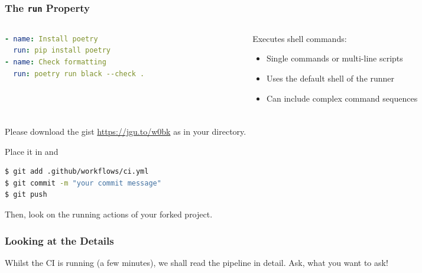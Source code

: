 \begin{frame}[fragile]
	\frametitle{The \texttt{run} Property}
	\begin{columns}
		\begin{column}{0.5\textwidth}
			\begin{lstlisting}[language=yaml,basicstyle=\small\ttfamily]
- name: Install poetry
  run: pip install poetry
- name: Check formatting
  run: poetry run black --check .
			\end{lstlisting}
		\end{column}
		\begin{column}{0.5\textwidth}
			Executes shell commands:
			\begin{itemize}
				\item Single commands or multi-line scripts
				\item Uses the default shell of the runner
				\item Can include complex command sequences
			\end{itemize}
		\end{column}
	\end{columns}
\end{frame}

\begin{frame}[fragile]
	\frametitle{}
	\begin{task}
		{Please download the gist \url{https://jgu.to/w0bk}} as  in your  directory.
	\end{task}
    Place it in  and
    \begin{lstlisting}[language=Bash, style=Shell]
$ git add .github/workflows/ci.yml
$ git commit -m "your commit message"
$ git push
    \end{lstlisting}
    Then, look on the running actions of your forked project.
\end{frame}

\begin{frame}[fragile]
	\frametitle{Looking at the Details}
	\begin{task}
		{Whilst the CI is running (a few minutes), we shall read the pipeline in detail. Ask, what you want to ask!}
	\end{task}
\end{frame}

